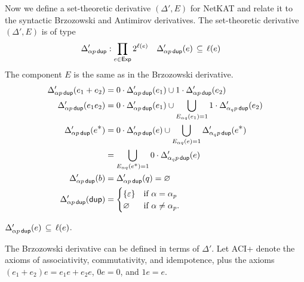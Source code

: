 \documentclass{article}
\newcommand\pdup{\mathop{\mathsf{dup}}}
\newcommand\Exp{\mathsf{Exp}}
\renewcommand\star{^{\textstyle *}}
\begin{document}
Now we define a set-theoretic derivative $(\Delta',E)$ for NetKAT and relate it to the syntactic Brzozowski and Antimirov derivatives.
The set-theoretic derivative $(\Delta',E)$ is of type
\begin{align*}
\Delta'_{\alpha p\pdup} &: \prod_{e\in\Exp}2^{\ell(e)} & \Delta'_{\alpha p\pdup}(e) &\subs \ell(e)
\end{align*}
The component $E$ is the same as in the Brzozowski derivative.
\begin{align*}
\Delta'_{\alpha p\pdup}(e_1+e_2) &= 0\cdot\Delta'_{\alpha p\pdup}(e_1) \cup 1\cdot\Delta'_{\alpha p\pdup}(e_2)\\
\Delta'_{\alpha p\pdup}(e_1e_2) &= 0\cdot\Delta'_{\alpha p\pdup}(e_1) \cup \bigcup_{E_{\alpha q}(e_1)=1} 1\cdot\Delta'_{\alpha_qp\pdup}(e_2)\\
\Delta'_{\alpha p\pdup}(e\star) &= 0\cdot\Delta'_{\alpha p\pdup}(e) \cup \bigcup_{E_{\alpha q}(e)=1}\Delta'_{\alpha_qp\pdup}(e\star)\\
&= \bigcup_{E_{\alpha q}(e^{\scriptstyle *})=1} 0\cdot\Delta'_{\alpha_qp\pdup}(e)\\
\Delta'_{\alpha p\pdup}(b) &= \Delta'_{\alpha p\pdup}(q) = \emptyset\\
\Delta'_{\alpha p\pdup}(\pdup) &= \begin{cases}
\{\eps\} & \text{if $\alpha=\alpha_p$}\\
\emptyset & \text{if $\alpha\neq\alpha_p$.}
\end{cases}
\end{align*}

\begin{lemma}
\label{eq:Deltacl}
$\Delta'_{\alpha p\pdup}(e) \subs \ell(e)$.
\end{lemma}

The Brzozowski derivative can be defined in terms of $\Delta'$.
Let ACI+ denote the axioms of associativity, commutativity, and idempotence, plus the axioms $(e_1+e_2)e = e_1e + e_2e$, $0e = 0$, and $1e = e$.
\end{document}

